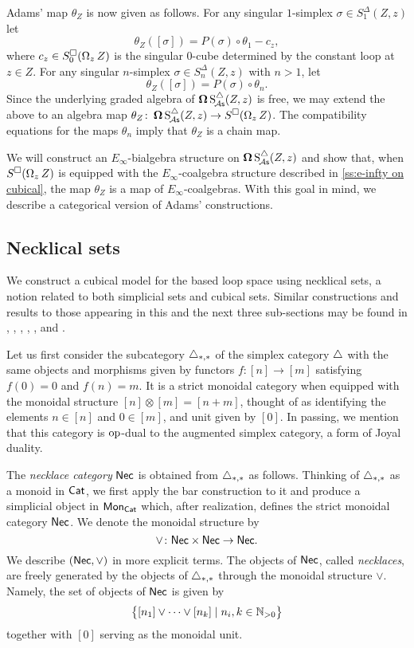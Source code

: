 Adams' map $\theta_Z$ is now given as follows.
For any singular $1$-simplex $\sigma \in S^{\Delta}_1(Z, z)$ let
\[
\theta_Z([\sigma]) = P(\sigma) \circ \theta_1 - c_z,
\]
where $c_z \in S^{\square}_0(\operatorname{\Omega}_z Z)$ is the singular $0$-cube determined by the constant loop at $z \in Z$.
For any singular $n$-simplex $\sigma \in S^{\Delta}_n(Z, z)$ with $n>1$, let
\[
\theta_Z([\sigma]) = P(\sigma) \circ \theta_n.
\]
Since the underlying graded algebra of $\operatorname{\mathbf{\Omega}} \operatorname{S^{\triangle}_{\!{\mathcal{A}\mathsf{s}}}}(Z, z)$ is free, we may extend the above to an algebra map $\theta_Z \colon \operatorname{\mathbf{\Omega}} \operatorname{S^{\triangle}_{\!{\mathcal{A}\mathsf{s}}}}(Z, z) \to S^{\square}(\operatorname{\Omega}_z Z)$.
The compatibility equations for the maps $\theta_n$ imply that $\theta_Z$ is a chain map.

We will construct an $E_{\infty}$-bialgebra structure on $\operatorname{\mathbf{\Omega}} \operatorname{S^{\triangle}_{\!{\mathcal{A}\mathsf{s}}}}(Z, z)$ and show that, when $S^{\square}(\operatorname{\Omega}_z Z)$ is equipped with the $E_{\infty}$-coalgebra structure described in \cref{ss:e-infty on cubical}, the map $\theta_Z$ is a map of $E_{\infty}$-coalgebras.
With this goal in mind, we describe a categorical version of Adams' constructions.

\subsection{Necklical sets}

We construct a cubical model for the based loop space using necklical sets, a notion related to both simplicial sets and cubical sets.
Similar constructions and results to those appearing in this and the next three sub-sections may be found in \cite{baues1980geometry}, \cite{berger1995loops}, \cite{baues1998hopf}, \cite{dugger2011rigidification}, \cite{galvez2020hopf}, and \cite{rivera2018cubical, rivera2019path}.

Let us first consider the subcategory $\triangle_{*,*}$ of the simplex category $\triangle$ with the same objects and morphisms given by functors $f \colon [n] \to [m]$ satisfying $f(0) = 0$ and $f(n) = m$.
It is a strict monoidal category when equipped with the monoidal structure $[n] \otimes [m] = [n+m]$, thought of as identifying the elements $n \in [n]$ and $0 \in [m]$, and unit given by $[0]$.
In passing, we mention that this category is $\mathrm{op}$-dual to the augmented simplex category, a form of Joyal duality.

The \textit{necklace category} $\mathsf{Nec}$ is obtained from $\triangle_{*,*}$ as follows.
Thinking of $\triangle_{*,*}$ as a monoid in $\mathsf{Cat}$, we first apply the bar construction to it and produce a simplicial object in $\mathsf{Mon}_{\mathsf{Cat}}$ which, after realization, defines the strict monoidal category $\mathsf{Nec}$.
We denote the monoidal structure by
\[
\vee \colon \mathsf{Nec} \times \mathsf{Nec} \to \mathsf{Nec}.
\]
We describe $(\mathsf{Nec}, \vee)$ in more explicit terms.
The objects of $\mathsf{Nec}$, called \textit{necklaces}, are freely generated by the objects of $\triangle_{*,*}$ through the monoidal structure $\vee$.
Namely, the set of objects of $\mathsf{Nec}$ is given by
\[
\big\{ [n_1] \vee \dots \vee[n_k] \mid n_i, k \in \mathbb{N}_{>0} \big\}
\]
together with $[0]$ serving as the monoidal unit.

